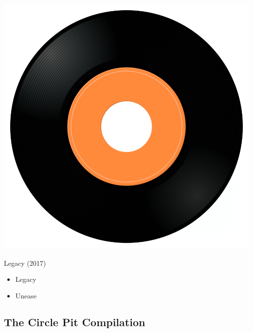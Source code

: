 \begin{minipage}[t]{0.25\textwidth}\vspace{0pt}
\captionsetup{type=figure}
\includegraphics[width=\textwidth]{Images/cover.png}
\caption*{Legacy (2017)}
\end{minipage}
\begin{minipage}[t]{0.25\textwidth}\vspace{0pt}
\begin{itemize}[nosep,leftmargin=1em,labelwidth=*,align=left]
	\setlength{\itemsep}{0pt}
	\item Legacy
	\item Unease
\end{itemize}
\end{minipage}


\subsection{The Circle Pit Compilation}

